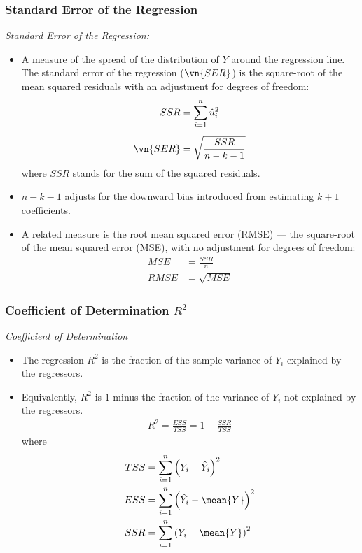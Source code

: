 

\begin{frame}[shrink=5]
\frametitle{Standard Error of the Regression}
\emph{Standard Error of the Regression:}
\begin{itemize}
\item A measure of the spread of the distribution of $Y$ around the regression line. The standard error of the regression ($\vn{SER}$) is the square-root of the mean squared residuals with an adjustment for degrees of freedom: 
\begin{align*}
SSR & = \sum_{i=1}^{n} \hat{u}_{i}^{2}\\[1ex]
\vn{SER} & = \sqrt{\frac{SSR}{n-k-1}}
\end{align*}
where $SSR$ stands for the sum of the squared residuals.
\item $n-k-1$ adjusts for the downward bias introduced from estimating $k+1$ coefficients.
\item A related measure is the root mean squared error (RMSE) --- the square-root of the mean squared error (MSE), with no adjustment for degrees of freedom: 
\begin{align*}
 MSE & = \frac{SSR}{n}\\
RMSE & = \sqrt{MSE}
\end{align*}
\end{itemize}
\end{frame}


\begin{frame}
\frametitle{Coefficient of Determination $R^{2}$}
\emph{Coefficient of Determination}
\begin{itemize}
\item The regression $R^{2}$ is the fraction of the sample variance of $Y_{i}$ explained by the regressors. 
\item Equivalently, $R^{2}$ is $1$ minus the fraction of the variance of $Y_{i}$ not explained by the regressors.
\begin{align*}
R^{2} = \frac{ESS}{TSS}
    = 1-\frac{SSR}{TSS}
\end{align*}
where 
\begin{align*}
TSS & = \sum_{i=1}^{n}\left(Y_{i}-\hat{Y}_{i}\right)^{2}\\
ESS & = \sum_{i=1}^{n}\left(\hat{Y}_{i}-\mean{Y}\right)^{2}\\
SSR & = \sum_{i=1}^{n}\left(Y_{i}-\mean{Y}\right)^{2}
\end{align*}
\end{itemize}
\end{frame}


